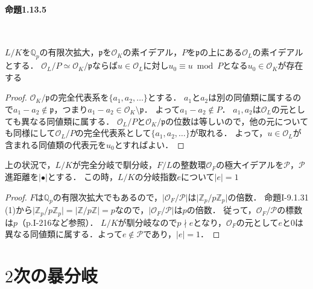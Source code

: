 \paragraph{命題1.13.5}~
\begin{screen}
  $L/K$を$\mathbb{Q}_p$の有限次拡大，$\mathfrak{p}$を$\mathcal{O}_K$の素イデアル，$P$を$\mathfrak{p}$の上にある$\mathcal{O}_L$の素イデアルとする．
  $\mathcal{O}_L/P\simeq\mathcal{O}_K/\mathfrak{p}$ならば$u\in\mathcal{O}_L$に対し$u_0\equiv u\bmod P$となる$u_0\in\mathcal{O}_K$が存在する
\end{screen}
\begin{proof}
  $\mathcal{O}_K/\mathfrak{p}$の完全代表系を$\{a_1,a_2,\ldots\}$とする．
  $a_1$と$a_2$は別の同値類に属するので$a_1-a_2\not\in\mathfrak{p}$，つまり$a_1-a_2\in\mathcal{O}_K\setminus\mathfrak{p}$．
  よって$a_1-a_2\not\in P$．
  $a_1, a_2$は$\mathcal{O}_L$の元としても異なる同値類に属する．
  $\mathcal{O}_L/P$と$\mathcal{O}_K/\mathfrak{p}$の位数は等しいので，他の元についても同様にして$\mathcal{O}_L/P$の完全代表系として$\{a_1,a_2,\ldots\}$が取れる．
  よって，$u\in\mathcal{O}_L$が含まれる同値類の代表元を$u_0$とすればよい．
\end{proof}

\begin{screen}
  上の状況で，$L/K$が完全分岐で馴分岐，$F/L$の整数環$\mathcal{O}_F$の極大イデアルを$\mathcal{P}$，$\mathcal{P}$進距離を$\lvert\bullet\rvert$とする．
  この時，$L/K$の分岐指数$e$について$\lvert e\rvert=1$
\end{screen}
\begin{proof}
  $F$は$\mathbb{Q}_p$の有限次拡大でもあるので，$\lvert\mathcal{O}_F/\mathcal{P}\rvert$は$\lvert\mathbb{Z}_p/p\mathbb{Z}_p\rvert$の倍数．
  命題I-9.1.31 (1)から$\lvert\mathbb{Z}_p/p\mathbb{Z}_p\rvert=\lvert\mathbb{Z}/p\mathbb{Z}\rvert=p$なので，$\lvert\mathcal{O}_F/\mathcal{P}\rvert$は$p$の倍数．
  従って，$\mathcal{O}_F/\mathcal{P}$の標数は$p$（p.I-216など参照）．
  $L/K$が馴分岐なので$p \nmid e$となり，$\mathcal{O}_F$の元として$e$と$0$は異なる同値類に属する．よって$e\not\in\mathcal{P}$であり，$\lvert e\rvert=1$．
\end{proof}

\section{$2$次の暴分岐}
